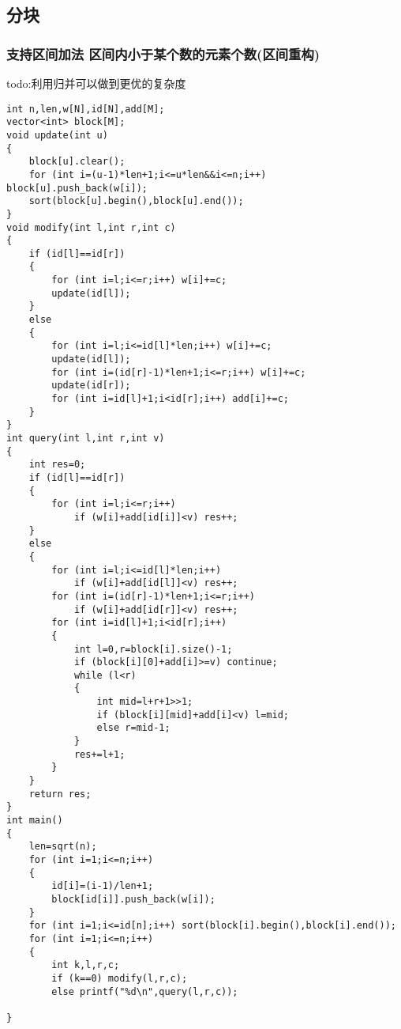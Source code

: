 \documentclass[a4paper]{ctexart}
\begin{document}
\subsection{分块}

\subsubsection{支持区间加法 区间内小于某个数的元素个数(区间重构)}
todo:利用归并可以做到更优的复杂度
\begin{lstlisting}
int n,len,w[N],id[N],add[M];
vector<int> block[M];
void update(int u)
{
	block[u].clear();
	for (int i=(u-1)*len+1;i<=u*len&&i<=n;i++) block[u].push_back(w[i]);
	sort(block[u].begin(),block[u].end());
}
void modify(int l,int r,int c)
{
	if (id[l]==id[r])
	{
		for (int i=l;i<=r;i++) w[i]+=c;
		update(id[l]);
	}
	else
	{
		for (int i=l;i<=id[l]*len;i++) w[i]+=c;
		update(id[l]);
		for (int i=(id[r]-1)*len+1;i<=r;i++) w[i]+=c;
		update(id[r]);
		for (int i=id[l]+1;i<id[r];i++) add[i]+=c;
	}
}
int query(int l,int r,int v)
{
	int res=0;
	if (id[l]==id[r])
	{
		for (int i=l;i<=r;i++)
			if (w[i]+add[id[i]]<v) res++;
	}
	else
	{
		for (int i=l;i<=id[l]*len;i++)
			if (w[i]+add[id[l]]<v) res++;
		for (int i=(id[r]-1)*len+1;i<=r;i++)
			if (w[i]+add[id[r]]<v) res++;
		for (int i=id[l]+1;i<id[r];i++)
		{
			int l=0,r=block[i].size()-1;
			if (block[i][0]+add[i]>=v) continue;
			while (l<r)
			{
				int mid=l+r+1>>1;
				if (block[i][mid]+add[i]<v) l=mid;
				else r=mid-1;
			}
			res+=l+1;
		}
	}
	return res;
}
int main()
{
	len=sqrt(n);
	for (int i=1;i<=n;i++)
	{
		id[i]=(i-1)/len+1;
		block[id[i]].push_back(w[i]);
	}
	for (int i=1;i<=id[n];i++) sort(block[i].begin(),block[i].end());
	for (int i=1;i<=n;i++)
	{
		int k,l,r,c;
		if (k==0) modify(l,r,c);
		else printf("%d\n",query(l,r,c));

}
\end{lstlisting}
\end{document}
